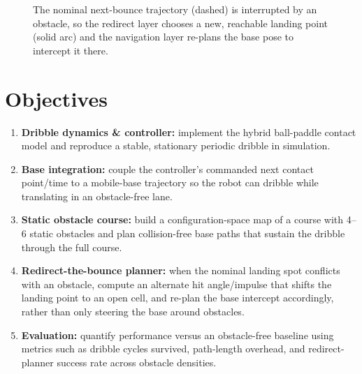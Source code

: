 \documentclass[10pt,twocolumn]{article}
\begin{document}
\begin{figure}[t]
\centering
{}
\caption{The nominal next-bounce trajectory (dashed) is interrupted by an
obstacle, so the redirect layer chooses a new, reachable landing point
(solid arc) and the navigation layer re-plans the base pose to intercept it
there.}
\label{fig:system}
\end{figure}

\section{Objectives}
\begin{enumerate}[nosep]
  \item \textbf{Dribble dynamics \& controller:} implement the hybrid
  ball-paddle contact model and reproduce a stable, stationary periodic
  dribble in simulation.
  \item \textbf{Base integration:} couple the controller's commanded next
  contact point/time to a mobile-base trajectory so the robot can dribble
  while translating in an obstacle-free lane.
  \item \textbf{Static obstacle course:} build a configuration-space map of
  a course with 4--6 static obstacles and plan collision-free base paths
  that sustain the dribble through the full course.
  \item \textbf{Redirect-the-bounce planner:} when the nominal landing spot
  conflicts with an obstacle, compute an alternate hit angle/impulse that
  shifts the landing point to an open cell, and re-plan the base intercept
  accordingly, rather than only steering the base around obstacles.
  \item \textbf{Evaluation:} quantify performance versus an obstacle-free
  baseline using metrics such as dribble cycles survived, path-length
  overhead, and redirect-planner success rate across obstacle densities.
\end{enumerate}
\end{document}

